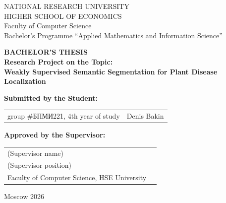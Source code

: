 \begin{titlepage}
\newpage

{
\begin{center}
NATIONAL RESEARCH UNIVERSITY\\
HIGHER SCHOOL OF ECONOMICS
\\
\bigskip
Faculty of Computer Science\\
Bachelor’s Programme “Applied Mathematics and Information Science”
\end{center}
}

\vspace{7em}

\begin{center}
{\bf BACHELOR'S THESIS}\\
{\bf Research Project on the Topic:}\\
{\bf Weakly Supervised Semantic Segmentation for Plant Disease Localization}\\
\end{center}

\vspace{2em}

{\bf Submitted by the Student: \vspace{2mm}}

{
\begin{tabular}{l@{\hskip 1.5cm}l}
group \#\foreignlanguage{russian}{БПМИ}221, 4th year of study & 
Denis Bakin
\end{tabular}}

\vspace{1em}
{\bf Approved by the Supervisor: \vspace{2mm}}

{
\begin{tabular}{l@{\hskip 1.5cm}l}
(Supervisor name)\\
(Supervisor position)\\
Faculty of Computer Science, HSE University
\end{tabular}}

\vspace{\fill}

\begin{center}
Moscow 2026
\end{center}

\end{titlepage}
